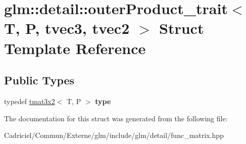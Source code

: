\hypertarget{structglm_1_1detail_1_1outer_product__trait_3_01_t_00_01_p_00_01tvec3_00_01tvec2_01_4}{}\section{glm\+:\+:detail\+:\+:outer\+Product\+\_\+trait$<$ T, P, tvec3, tvec2 $>$ Struct Template Reference}
\label{structglm_1_1detail_1_1outer_product__trait_3_01_t_00_01_p_00_01tvec3_00_01tvec2_01_4}
\subsection*{Public Types}
\begin{DoxyCompactItemize}
\item 
typedef \hyperlink{structglm_1_1detail_1_1tmat3x2}{tmat3x2}$<$ T, P $>$ {\bfseries type}\hypertarget{structglm_1_1detail_1_1outer_product__trait_3_01_t_00_01_p_00_01tvec3_00_01tvec2_01_4_a241608939fa083f2ddb7c701be75a732}{}\label{structglm_1_1detail_1_1outer_product__trait_3_01_t_00_01_p_00_01tvec3_00_01tvec2_01_4_a241608939fa083f2ddb7c701be75a732}

\end{DoxyCompactItemize}


The documentation for this struct was generated from the following file\+:\begin{DoxyCompactItemize}
\item 
Cadriciel/\+Commun/\+Externe/glm/include/glm/detail/func\+\_\+matrix.\+hpp\end{DoxyCompactItemize}
